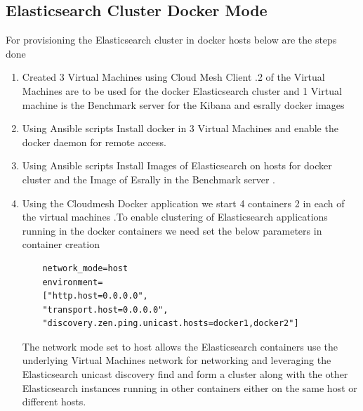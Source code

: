 \documentclass[9pt,twocolumn,twoside]{../../styles/osajnl}
\begin{document}
 \subsection{Elasticsearch Cluster Docker Mode}
  For provisioning the Elasticsearch cluster in docker hosts below are the steps done
\begin{enumerate}
\item Created 3 Virtual Machines using Cloud Mesh Client .2 of the Virtual Machines  are to be used for the docker Elasticsearch cluster and 1 Virtual machine is the Benchmark server for the Kibana and esrally docker images 
\item Using Ansible scripts Install docker in 3 Virtual Machines and enable the docker daemon for remote access.
\item Using Ansible scripts Install Images of Elasticsearch  on hosts for docker cluster and the Image of Esrally in the Benchmark server .
\item Using the Cloudmesh Docker application we start 4 containers 2 in each of the virtual machines .To enable clustering of Elasticsearch applications running in the docker containers we need set the below parameters in container creation
\begin{verbatim}
    network_mode=host 
    environment=
    ["http.host=0.0.0.0",
    "transport.host=0.0.0.0",
    "discovery.zen.ping.unicast.hosts=docker1,docker2"]
\end{verbatim}

The network mode set to host allows the Elasticsearch containers use the underlying Virtual Machines  network for networking and leveraging the Elasticsearch unicast discovery find and form a cluster along with the other Elasticsearch instances running in other
containers either on the same host or different hosts.

\end{enumerate}
\end{document}
